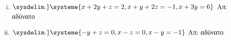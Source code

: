 \begin{enumerate}
\begin{enumerate}[i)]
  \item $ 
  \sysdelim.\}
  \systeme{
    x+2y+z=2,
    x+y+2z=-1,
    x+3y=6
  } $ 
  \hfill Απ: αδύνατο 

\item $ 
\sysdelim.\}
\systeme{
  -y+z=0,
  x-z=0,
  x-y=-1
} $ 
\hfill Απ: αδύνατο 

\end{enumerate}
\end{enumerate}


